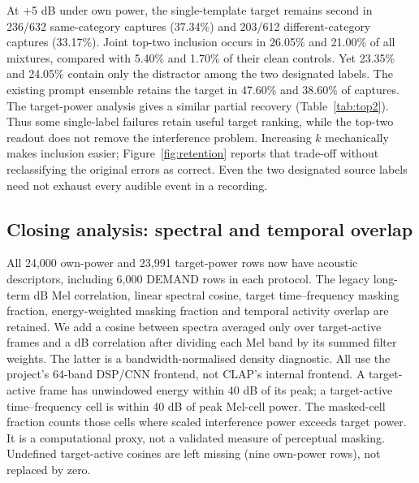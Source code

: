 At +5 dB under own power, the single-template target remains second in
236/632 same-category captures (37.34\%) and 203/612 different-category captures
(33.17\%). Joint top-two inclusion occurs in 26.05\% and 21.00\% of all mixtures,
compared with 5.40\% and 1.70\% of their clean controls. Yet 23.35\% and 24.05\%
contain only the distractor among the two designated labels. The existing prompt
ensemble retains the target in 47.60\% and 38.60\% of captures. The target-power
analysis gives a similar partial recovery (Table~\ref{tab:top2}). Thus some
single-label failures retain useful target ranking, while the top-two readout
does not remove the interference problem. Increasing $k$ mechanically makes
inclusion easier; Figure~\ref{fig:retention} reports that trade-off without
reclassifying the original errors as correct. Even the two designated source
labels need not exhaust every audible event in a recording.


\subsection{Closing analysis: spectral and temporal overlap}
All 24,000 own-power and 23,991 target-power rows now have acoustic descriptors,
including 6,000 DEMAND rows in each protocol. The legacy long-term dB Mel
correlation, linear spectral cosine, target time--frequency masking fraction,
energy-weighted masking fraction and temporal activity overlap are retained.
We add a cosine between spectra averaged only over target-active frames and a
dB correlation after dividing each Mel band by its summed filter weights.
The latter is a bandwidth-normalised density diagnostic. All use the project's
64-band DSP/CNN frontend, not CLAP's internal frontend. A target-active frame
has unwindowed energy within 40 dB of its peak; a target-active time--frequency
cell is within 40 dB of peak Mel-cell power. The masked-cell fraction counts
those cells where scaled interference power exceeds target power. It is a
computational proxy, not a validated measure of perceptual masking. Undefined
target-active cosines are left missing (nine own-power rows), not replaced by zero.

